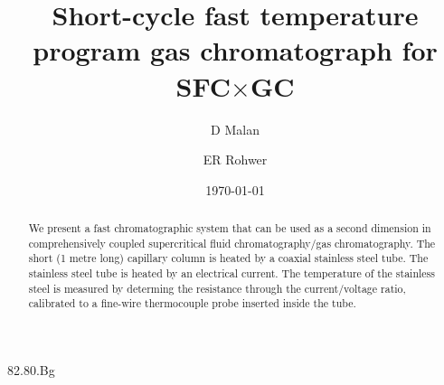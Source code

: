 \documentclass[aip,rsi,reprint,graphicx]{revtex4-1} %
\begin{document}

\title{Short-cycle fast temperature program gas chromatograph for SFC$\times$GC} %



\author{D Malan}

\author{ER Rohwer}



\date{\today}

\begin{abstract}
We present a fast chromatographic system that can be used as a second dimension in comprehensively coupled supercritical fluid chromatography/gas chromatography. The short (1 metre long) capillary column is heated by a coaxial stainless steel tube. The stainless steel tube is heated by an electrical current. The temperature of the stainless steel is measured by determing the resistance through the current/voltage ratio, calibrated to a fine-wire thermocouple probe inserted inside the tube. 
\end{abstract}

\pacs{}%
{82.80.Bg}
\maketitle %
\end{document}
